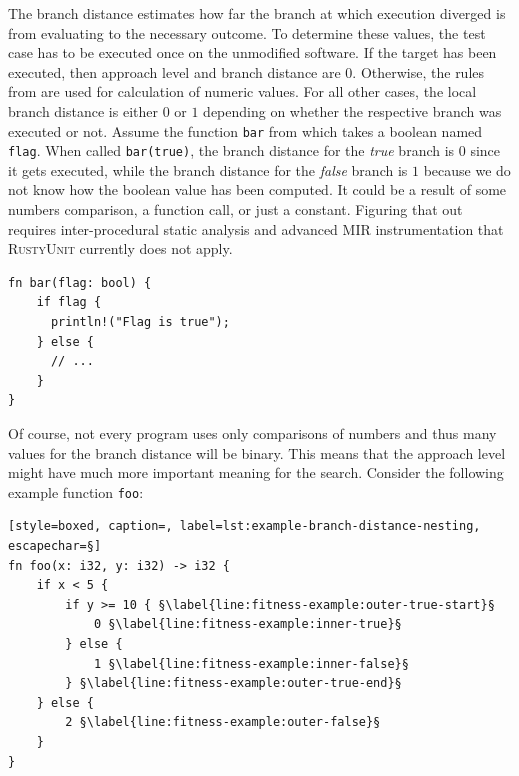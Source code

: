 \documentclass[paper=a4,%
  twoside,%
  BCOR4mm,%
  abstract=true,%
  toc=bibliography,%
  chapterprefix=true,%
  toc=bibliographynumbered,%
  open=right,%
  english,%
  pagesize=pdftex]{scrreprt}
\newcommand{\tech}{\textsc{RustyUnit}\xspace}
\newcommand{\mir}{\ac{MIR}\xspace}
\begin{document}
The branch distance estimates how far the branch at which execution diverged is from evaluating to the necessary outcome. To determine these values, the test case has to be executed once on the unmodified software. If the target has been executed, then approach level and branch distance are $0$. Otherwise, the rules from  are used for calculation of numeric values. For all other cases, the local branch distance is either $0$ or $1$ depending on whether the respective branch was executed or not. Assume the function \texttt{bar} from  which takes a boolean named \texttt{flag}. When called \texttt{bar(true)}, the branch distance for the \emph{true} branch is $0$ since it gets executed, while the branch distance for the \emph{false} branch is $1$ because we do not know how the boolean value has been computed. It could be a result of some numbers comparison, a function call, or just a constant. Figuring that out requires inter-procedural static analysis and advanced \mir instrumentation that \tech currently does not apply.

\begin{lstlisting}[style=boxed, caption={Computation of local branch distance for a boolean flag that we do not know where it came from}, label=lst:example-branch-distance-boolean-flag]
fn bar(flag: bool) {
    if flag {
      println!("Flag is true");
    } else {
      // ...
    }
}
\end{lstlisting}

Of course, not every program uses only comparisons of numbers and thus many values for the branch distance will be binary. This means that the approach level might have much more important meaning for the search. Consider the following example function \texttt{foo}:

\begin{lstlisting}[style=boxed, caption=, label=lst:example-branch-distance-nesting, escapechar=§]
fn foo(x: i32, y: i32) -> i32 {
    if x < 5 {
        if y >= 10 { §\label{line:fitness-example:outer-true-start}§
            0 §\label{line:fitness-example:inner-true}§
        } else {
            1 §\label{line:fitness-example:inner-false}§
        } §\label{line:fitness-example:outer-true-end}§
    } else {
        2 §\label{line:fitness-example:outer-false}§
    }
}
\end{lstlisting}
\end{document}
